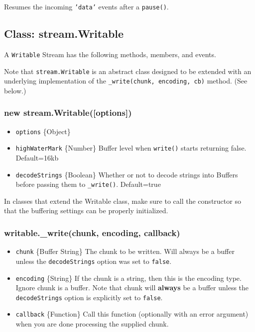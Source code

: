 Resumes the incoming \texttt{'data'} events after a \texttt{pause()}.

\subsection{Class: stream.Writable}

A \texttt{Writable} Stream has the following methods, members, and
events.

Note that \texttt{stream.Writable} is an abstract class designed to be
extended with an underlying implementation of the
\texttt{\_write(chunk, encoding, cb)} method. (See below.)

\subsubsection{new stream.Writable({[}options{]})}

\begin{itemize}
\item
  \texttt{options} \{Object\}
\item
  \texttt{highWaterMark} \{Number\} Buffer level when \texttt{write()}
  starts returning false. Default=16kb
\item
  \texttt{decodeStrings} \{Boolean\} Whether or not to decode strings
  into Buffers before passing them to \texttt{\_write()}. Default=true
\end{itemize}

In classes that extend the Writable class, make sure to call the
constructor so that the buffering settings can be properly initialized.

\subsubsection{writable.\_write(chunk, encoding, callback)}

\begin{itemize}
\item
  \texttt{chunk} \{Buffer \textbar{} String\} The chunk to be written.
  Will always be a buffer unless the \texttt{decodeStrings} option was
  set to \texttt{false}.
\item
  \texttt{encoding} \{String\} If the chunk is a string, then this is
  the encoding type. Ignore chunk is a buffer. Note that chunk will
  \textbf{always} be a buffer unless the \texttt{decodeStrings} option
  is explicitly set to \texttt{false}.
\item
  \texttt{callback} \{Function\} Call this function (optionally with an
  error argument) when you are done processing the supplied chunk.
\end{itemize}

